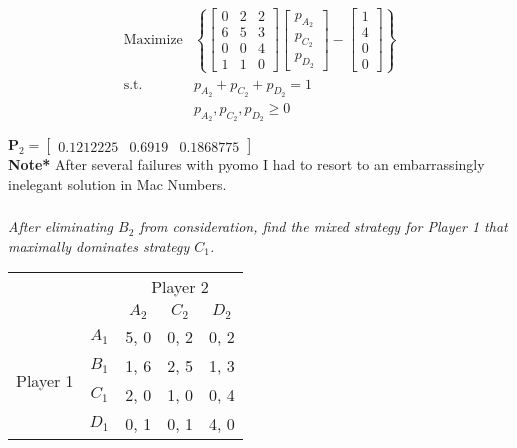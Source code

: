 \documentclass[12pt]{amsart}
\begin{document}
	\begin{align*} 
		\text{Maximize} &\left\{
		\begin{bmatrix}
			0 & 2 & 2 \\
			6 & 5 & 3 \\
			0 & 0 & 4 \\
			1 & 1 & 0 
		\end{bmatrix} 
		\begin{bmatrix}
			p_{A_2} \\ p_{C_2} \\ p_{D_2}
		\end{bmatrix} -
		\begin{bmatrix}
			1 \\ 4 \\ 0 \\ 0
		\end{bmatrix}
		\right\} \\
		\text{s.t. }\qquad 
		&p_{A_2} + p_{C_2} + p_{D_2} = 1 \\
		&p_{A_2},p_{C_2},p_{D_2} \geq 0 
	\end{align*}
	
	\(\mathbf P_2 = \begin{bmatrix}0.1212225 & 0.6919 & 0.1868775\end{bmatrix}\) \\

	\textbf{Note*} After several failures with pyomo I had to resort to an 
	embarrassingly inelegant solution in Mac Numbers\textsuperscript{\texttrademark}.

	\subsubsection{}
	\textit{After eliminating $B_2$ from consideration, find the mixed strategy for Player 1 that
	maximally dominates strategy $C_1$.}
	
	\begin{center}
		\def\arraystretch{1.25}%
		\begin{tabular}{ccccc}
			&                            & \multicolumn{3}{c}{Player 2}                                                         \\
			& \multicolumn{1}{c|}{}      & \multicolumn{1}{c|}{$A_2$} & \multicolumn{1}{c|}{$C_2$} & \multicolumn{1}{c|}{$D_2$} \\ \cline{2-5} 
			\multirow{4}{*}{Player 1} & \multicolumn{1}{c|}{$A_1$} & \multicolumn{1}{c|}{5, 0}  & \multicolumn{1}{c|}{0, 2}  & \multicolumn{1}{c|}{0, 2}  \\ \cline{2-5} 
			& \multicolumn{1}{c|}{$B_1$} & \multicolumn{1}{c|}{1, 6}  & \multicolumn{1}{c|}{2, 5}  & \multicolumn{1}{c|}{1, 3}  \\ \cline{2-5} 
			& \multicolumn{1}{c|}{$C_1$} & \multicolumn{1}{c|}{2, 0}  & \multicolumn{1}{c|}{1, 0}  & \multicolumn{1}{c|}{0, 4}  \\ \cline{2-5} 
			& \multicolumn{1}{c|}{$D_1$} & \multicolumn{1}{c|}{0, 1}  & \multicolumn{1}{c|}{0, 1}  & \multicolumn{1}{c|}{4, 0}  \\ \cline{2-5} 
		\end{tabular}
	\end{center}
\end{document}
